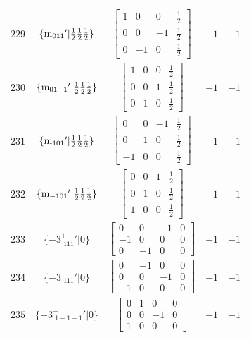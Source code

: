 \documentclass[fleqn,8pt]{jsarticle}
\begin{document}
\begin{longtable}{ccccc}
$ 229 $ & $ \{{\rm m}_{011}{}'|\frac{1}{2} \frac{1}{2} \frac{1}{2}\} $ & $ \begin{bmatrix} 1 & 0 & 0 & \frac{1}{2} \\ 0 & 0 & -1 & \frac{1}{2} \\ 0 & -1 & 0 & \frac{1}{2} \end{bmatrix} $ & $ -1 $ & $ -1 $ \\ \hline
$ 230 $ & $ \{{\rm m}_{01-1}{}'|\frac{1}{2} \frac{1}{2} \frac{1}{2}\} $ & $ \begin{bmatrix} 1 & 0 & 0 & \frac{1}{2} \\ 0 & 0 & 1 & \frac{1}{2} \\ 0 & 1 & 0 & \frac{1}{2} \end{bmatrix} $ & $ -1 $ & $ -1 $ \\ \hline
$ 231 $ & $ \{{\rm m}_{101}{}'|\frac{1}{2} \frac{1}{2} \frac{1}{2}\} $ & $ \begin{bmatrix} 0 & 0 & -1 & \frac{1}{2} \\ 0 & 1 & 0 & \frac{1}{2} \\ -1 & 0 & 0 & \frac{1}{2} \end{bmatrix} $ & $ -1 $ & $ -1 $ \\ \hline
$ 232 $ & $ \{{\rm m}_{-101}{}'|\frac{1}{2} \frac{1}{2} \frac{1}{2}\} $ & $ \begin{bmatrix} 0 & 0 & 1 & \frac{1}{2} \\ 0 & 1 & 0 & \frac{1}{2} \\ 1 & 0 & 0 & \frac{1}{2} \end{bmatrix} $ & $ -1 $ & $ -1 $ \\ \hline
$ 233 $ & $ \{-3^{+}_{\,\,111}{}'|0\} $ & $ \begin{bmatrix} 0 & 0 & -1 & 0 \\ -1 & 0 & 0 & 0 \\ 0 & -1 & 0 & 0 \end{bmatrix} $ & $ -1 $ & $ -1 $ \\ \hline
$ 234 $ & $ \{-3^{-}_{\,\,111}{}'|0\} $ & $ \begin{bmatrix} 0 & -1 & 0 & 0 \\ 0 & 0 & -1 & 0 \\ -1 & 0 & 0 & 0 \end{bmatrix} $ & $ -1 $ & $ -1 $ \\ \hline
$ 235 $ & $ \{-3^{-}_{\,\,1-1-1}{}'|0\} $ & $ \begin{bmatrix} 0 & 1 & 0 & 0 \\ 0 & 0 & -1 & 0 \\ 1 & 0 & 0 & 0 \end{bmatrix} $ & $ -1 $ & $ -1 $ \\ \hline

\end{longtable}
\end{document}
